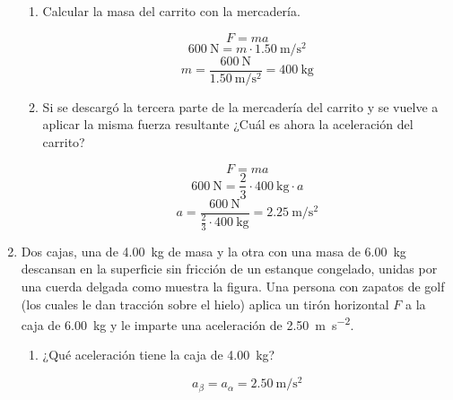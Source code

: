 \documentclass[../practica.root.tex]{subfiles}
\begin{document}
\begin{enumerate}
	      \begin{enumerate}
		      \item Calcular la masa del carrito con la mercadería.

		            \[F=ma\]
		            \[\SI{600}{\newton}=m\cdot\SI{1,50}{\meter\per\second\squared}\]
		            \[m=\frac{\SI{600}{\newton}}{\SI{1,50}{\meter\per\second\squared}}=\boxed{\SI{400}{\kilogram}}\]

		      \item Si se descargó la tercera parte de la mercadería del carrito y se vuelve a aplicar la misma fuerza resultante ¿Cuál es ahora la aceleración del carrito?

		            \[F=ma\]
		            \[\SI{600}{\newton}=\frac{2}{3}\cdot\SI{400}{\kilogram}\cdot a\]
		            \[a=\frac{\SI{600}{\newton}}{\frac{2}{3}\cdot\SI{400}{\kilogram}}=\boxed{\SI{2,25}{\meter\per\second\squared}}\]
	      \end{enumerate}

	\item Dos cajas, una de \SI{4,00}{\kg} de masa y la otra con una masa de \SI{6,00}{\kg} descansan en la superficie sin fricción de un estanque congelado, unidas por una cuerda delgada como muestra la figura. Una persona con zapatos de golf (los cuales le dan tracción sobre el hielo) aplica un tirón horizontal $F$ a la caja de \SI{6,00}{\kg} y le imparte una aceleración de \SI{2,50}{\meter\per\second\squared}.

	      \begin{center}
	      \end{center}

	      \begin{enumerate}
		      \item ¿Qué aceleración tiene la caja de \SI{4,00}{\kg}?

		            \[a_\beta=a_\alpha=\boxed{\SI{2,50}{\meter\per\second\squared}}\]


\end{enumerate}
\end{enumerate}
\end{document}
